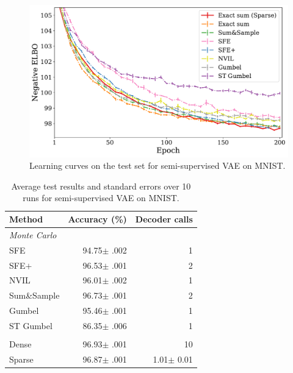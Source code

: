 \begin{figure}[htbp]
    \centering
    \includegraphics[width=.9\textwidth]{Figures/ss_mnist_elbo_path.pdf}
    \caption{\label{fig:ssvaeelbo}Learning curves on the test set for semi-supervised VAE on MNIST.}
\end{figure}

\begin{table}[t]
    \centering
    \tlfstyle
    \begin{tabular}{lrr}
        \toprule
        Method &
        Accuracy (\%)
               & Decoder calls                                                \\
        \midrule

        \multicolumn{3}{l}{\emph{Monte Carlo}}                                \\
        SFE
               & 94.75{\color{gray}$\pm$ .002} & 1                            \\
        SFE$+$
               & 96.53{\color{gray}$\pm$ .001} & 2                            \\
        NVIL
               & 96.01{\color{gray}$\pm$ .002} & 1                            \\
        Sum\&Sample
               & 96.73{\color{gray}$\pm$ .001} & 2                            \\
        Gumbel
               & 95.46{\color{gray}$\pm$ .001} & 1                            \\
        ST Gumbel
               & 86.35{\color{gray}$\pm$ .006} & 1                            \\
        \spacerule
        \multicolumn{3}{l}{\emph{Marginalization}}                            \\
        Dense
               & 96.93{\color{gray}$\pm$ .001} & 10                           \\
        Sparse {\small \color{gray}{(proposed)}}
               & 96.87{\color{gray}$\pm$ .001} & 1.01{\color{gray}$\pm$ 0.01} \\
        \bottomrule
    \end{tabular}
    \caption[Test set results for semi-supervised VAE on MNIST.]{\label{tab:ssvaeelbo}
        Average test results and standard errors over 10 runs for semi-supervised VAE on MNIST.}
\end{table}

